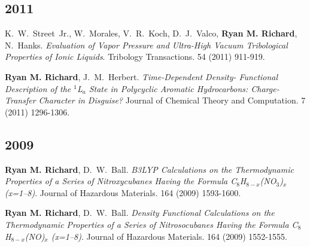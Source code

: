 \begin{etaremune}
	\subsection{2011}
	\item{K.~W.~Street~Jr., W.~Morales, V.~R.~Koch, D.~J.~Valco, 
	      \textbf{Ryan M. Richard}, N.~Hanks.  {\em Evaluation of Vapor Pressure
		  and Ultra-High Vacuum Tribological Properties of Ionic Liquids}. 
		  Tribology Transactions.  54 (2011) 911-919.}
	\item{\textbf{Ryan M. Richard},  J.~M.~Herbert. {\em Time-Dependent Density-
	      Functional Description of the $^1$L$_a$ State in Polycyclic Aromatic 
		  Hydrocarbons: Charge-Transfer Character in Disguise?} Journal of 
		  Chemical Theory and Computation. 7 (2011) 1296-1306. }

	\subsection{2009}
	\item{\textbf{Ryan M. Richard}, D.~W.~Ball. {\em B3LYP Calculations on the 
	      Thermodynamic Properties of a Series of Nitroxycubanes Having the 
		  Formula C$_8$H$_{8-x}$(NO$_3$)$_x$ (x=1--8)}.  Journal of Hazardous 
		  Materials.  164 (2009) 1593-1600.}
	\item{\textbf{Ryan M. Richard}, D.~W.~Ball.  {\em Density Functional 
	      Calculations on the Thermodynamic Properties of a Series of 
		  Nitrosocubanes Having the Formula C$_8$H$_{8-x}$(NO)$_x$ (x=1--8)}.  
		  Journal of Hazardous Materials. 164 (2009) 1552-1555.}


\end{etaremune}

